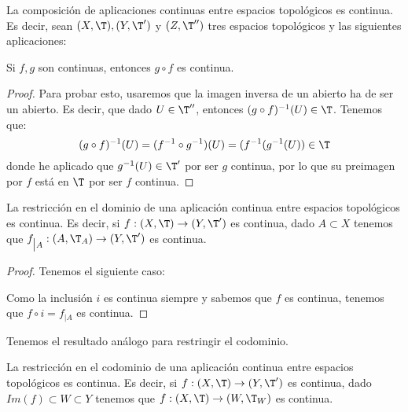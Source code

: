 \begin{prop}
    La composición de aplicaciones continuas entre espacios topológicos es continua. Es decir, sean $(X,\T),(Y,\T')$ y $(Z,\T'')$ tres espacios topológicos y las siguientes aplicaciones:
    \begin{figure}[H]
        \centering
    \end{figure}

    Si $f,g$ son continuas, entonces $g\circ f$ es continua.
\end{prop}
\begin{proof}
    Para probar esto, usaremos que la imagen inversa de un abierto ha de ser un abierto. Es decir, que dado $U\in \T''$, entonces $(g\circ f)^{-1}(U)\in \T$. Tenemos que:
    \begin{equation*}
        (g\circ f)^{-1}(U) = (f^{-1}\circ g^{-1})(U) = (f^{-1} (g^{-1}(U))\in \T
    \end{equation*}
    donde he aplicado que $g^{-1}(U)\in \T'$ por ser $g$ continua, por lo que su preimagen por $f$ está en $\T$ por ser $f$ continua.
\end{proof}

\begin{coro}
    La restricción en el dominio de una aplicación continua entre espacios topológicos es continua. Es decir, si $f:(X,\T)\to (Y,\T')$ es continua, dado $A\subset X$ tenemos que $f_{\big| A}:(A,\T_A)\to (Y,\T')$ es continua.
\end{coro}
\begin{proof}
    Tenemos el siguiente caso:
    \begin{figure}[H]
        \centering
    \end{figure}
    Como la inclusión $i$ es continua siempre y sabemos que $f$ es continua, tenemos que $f\circ i = f_{\big| A}$ es continua.
\end{proof}

Tenemos el resultado análogo para restringir el codominio.
\begin{coro}
    La restricción en el codominio de una aplicación continua entre espacios topológicos es continua. Es decir, si $f:(X,\T)\to (Y,\T')$ es continua, dado $Im(f)\subset W\subset Y$ tenemos que $f:(X,\T)\to (W,\T_W)$ es continua.
\end{coro}

